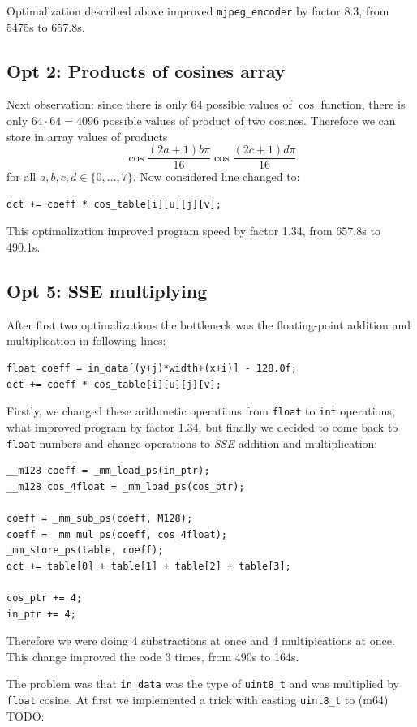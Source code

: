 \documentclass[11pt]{article}
\begin{document}
Optimalization described above improved \texttt{mjpeg\_encoder} by factor 8.3, from 5475s to 657.8s.

\subsection{Opt 2: Products of cosines array}
Next observation: since there is only 64 possible values of $\cos$ function,
there is only $64 \cdot 64 = 4096$ possible values of product of two cosines.
Therefore we can store in array values of products
$$\cos \frac{(2a + 1) b \pi}{16}
\cos \frac{(2c + 1) d \pi}{16}$$
for all $a, b, c, d \in \{0, \ldots, 7 \}$.
Now considered line changed to:
\begin{lstlisting}
dct += coeff * cos_table[i][u][j][v];
\end{lstlisting}
This optimalization improved program speed by factor 1.34, from 657.8s to 490.1s.

\subsection{Opt 5: SSE multiplying}
After first two optimalizations the bottleneck was the floating-point addition and multiplication in following lines:
\begin{lstlisting}
float coeff = in_data[(y+j)*width+(x+i)] - 128.0f;
dct += coeff * cos_table[i][u][j][v];
\end{lstlisting}
Firstly, we changed these arithmetic operations from \texttt{float} to \texttt{int} operations, what improved program by factor 1.34, 
but finally we decided to come back to \texttt{float} numbers and change operations to \emph{SSE} addition and multiplication:
\begin{lstlisting}
__m128 coeff = _mm_load_ps(in_ptr);
__m128 cos_4float = _mm_load_ps(cos_ptr);

coeff = _mm_sub_ps(coeff, M128);
coeff = _mm_mul_ps(coeff, cos_4float);
_mm_store_ps(table, coeff);
dct += table[0] + table[1] + table[2] + table[3];

cos_ptr += 4;
in_ptr += 4;
\end{lstlisting}
Therefore we were doing 4 substractions at once and 4 multipications at once.
This change improved the code 3 times, from 490s to 164s.

The problem was that \texttt{in\_data} was the type of \texttt{uint8\_t}
and was multiplied by \texttt{float} cosine.
At first we implemented a trick with casting \texttt{uint8\_t} to (m64) TODO:
\end{document}
